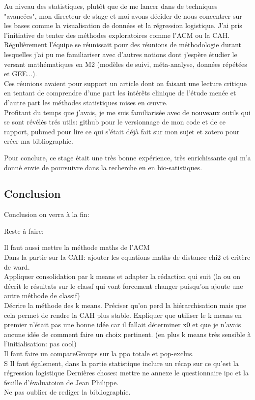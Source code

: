 \documentclass{book}
\begin{document}
Au niveau des statistiques, plutôt que de me lancer dans de techniques "avancées", mon directeur de stage et moi avons décider de nous concentrer sur les bases comme la visualisation de données et la régression logistique. J'ai pris l'initiative de tenter des méthodes exploratoires comme l'ACM ou la CAH.\\
Régulièrement l'équipe se réunissait pour des réunions de méthodologie durant lesquelles j'ai pu me familiariser avec d'autres notions dont j'espère étudier le versant mathématiques en M2 (modèles de suivi, méta-analyse, données répétées et GEE...).\\
Ces réunions avaient pour support un article dont on faisant une lecture critique en tentant de comprendre d'une part les intérêts clinique de l'étude menée et d'autre part les méthodes statistiques mises en œuvre.\\

Profitant du temps que j'avais, je me suis familiarisée avec de nouveaux outils qui se sont révélés trés utils: github pour le versionnage de mon code et de ce rapport, pubmed pour lire ce qui s'était déjà fait sur mon sujet et zotero pour créer ma bibliographie.

Pour conclure, ce stage était une très bonne expérience, très enrichissante qui m'a donné envie de poursuivre dans la recherche en en bio-satistiques.\\

\begin{center}
\section*{Conclusion}
Conclusion on verra à la fin:

Reste à faire: 

Il faut aussi mettre la méthode maths de l'ACM\\
Dans la partie sur la CAH: ajouter les equations maths de distance chi2 et critère de ward.\\
Appliquer consolidation par k means et adapter la rédaction qui suit (la ou on décrit le résultats sur le classf qui vont forcement changer puisqu'on ajoute une autre méthode de classif)\\
Décrire la méthode des k means. Préciser qu'on perd la hiérarchisation mais que cela permet de rendre la CAH plus stable. Expliquer que utiliser le k means en premier n'était pas une bonne idée car il fallait déterminer x0 et que je n'avais aucune idée de comment faire un choix pertinent. (en plus k means très sensible à l'initialisation: pas cool)\\

Il faut faire un compareGroups sur la ppo totale et pop-exclus.\\S
Il faut également, dans la partie statistique inclure un récap sur ce qu'est la régression logistique 
Dernières choses: mettre ne annexe le questionnaire ipc et la feuille d'évaluatoion de Jean Philippe.\\
Ne pas oublier de rediger la bibliographie.\\
\end{center}
\end{document}
